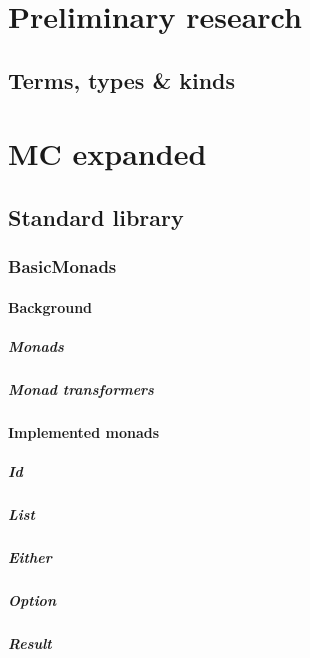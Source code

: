 \begin{multicols}{3}


\part{Preliminary research}
\chapter{Terms, types \& kinds}



\part{MC expanded}

\chapter{Standard library}
\section{BasicMonads}
\subsection{Background}
\subsubsection{Monads}
\subsubsection{Monad transformers}
\subsection{Implemented monads}
\subsubsection{Id}
\subsubsection{List}
\subsubsection{Either}
\subsubsection{Option}
\subsubsection{Result}

\end{multicols}
